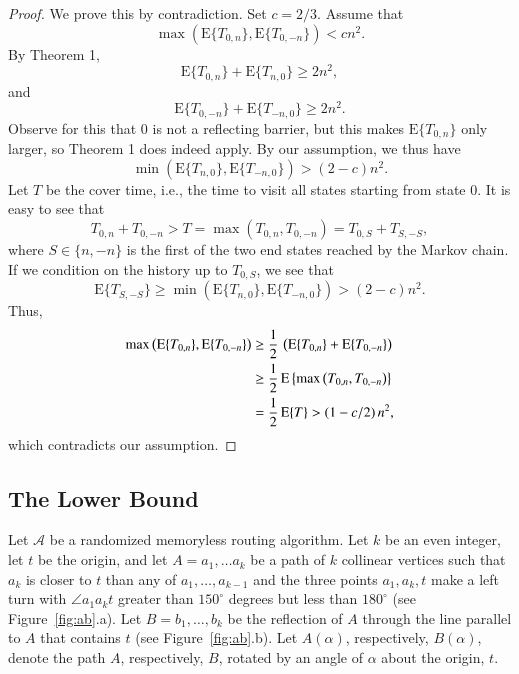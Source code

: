 \documentclass{elsarticle}
\newcommand{\EXP}{\mathrm{E}}
\begin{document}
\begin{proof}
We prove this by contradiction. Set $c = 2/3$. Assume that
\[
\max \left( \EXP \{ T_{0,n} \} , \EXP \{ T_{0,-n} \} \right) <  cn^2.
\]
By Theorem 1,
\[
 \EXP \{ T_{0,n} \}  +  \EXP \{ T_{n,0} \}  \ge 2n^2,
\]
and
\[
 \EXP \{ T_{0,-n} \}  +  \EXP \{ T_{-n,0} \}  \ge 2n^2.
\]
Observe for this that $0$ is not a reflecting barrier, but this makes 
$ \EXP \{ T_{0,n} \}$ only larger, so Theorem 1 does indeed apply.
By our assumption, we thus have
\[
\min \left( \EXP \{ T_{n,0} \} ,  \EXP \{ T_{-n,0} \} \right) >  (2-c) n^2.
\]
Let $T$ be the cover time, i.e., the time to visit all states starting from state $0$. It is easy to see that
\[
T_{0,n} + T_{0,-n} > T = \max \left( T_{0,n} , T_{0,-n} \right)
  =  T_{0,S} + T_{S,-S},
\]
where $S \in \{ n, -n \}$ is the first of the two end states
reached by the Markov chain. If we condition on the history up to $T_{0,S}$,
we see that
\[
\EXP \{ T_{S,-S} \} \ge \min \left( \EXP \{ T_{n,0} \} ,  \EXP \{ T_{-n,0} \} \right) >  (2-c) n^2.
\]
Thus,
\begin{align*}
\max \left( \EXP \{ T_{0,n} \} , \EXP \{ T_{0,-n} \} \right)
 & \ge {1 \over 2} \, \left( \EXP \{ T_{0,n} \} + \EXP \{ T_{0,-n} \} \right) \\
 & \ge {1 \over 2} \, \EXP \left\{ \max \left( T_{0,n} , T_{0,-n} \right) \right\} \\
& = {1 \over 2} \, \EXP \{ T \}
>  (1- c/2 ) \,  n^2 ,
\end{align*}
which contradicts our assumption.
\end{proof}


\subsection{The Lower Bound}
\label{sec:bound}

Let $\mathcal{A}$ be a randomized memoryless routing algorithm.  Let $k$
be an even integer, let $t$ be the origin, and let $A=a_1,\ldots a_k$ be
a path of $k$ collinear vertices such that $a_{k}$ is closer to $t$ than
any of $a_1,\ldots,a_{k-1}$ and the three points $a_{1},a_{k},t$ make a left turn with $\angle
a_{1}a_{k}t$ greater than $150^\circ$ degrees but less than $180^\circ$ (see Figure~\ref{fig:ab}.a). Let
$B=b_1,\ldots,b_k$ be the reflection of $A$ through the line parallel
to $A$ that contains $t$ (see Figure~\ref{fig:ab}.b).  Let $A(\alpha)$,
respectively, $B(\alpha)$, denote the path $A$, respectively, $B$,
rotated by an angle of $\alpha$ about the origin, $t$.
\end{document}
